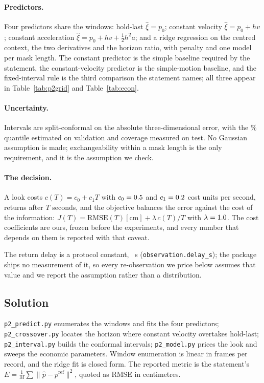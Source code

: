 \documentclass{swmcmthesis}
\begin{document}
\paragraph{Predictors.} Four predictors share the windows: hold-last
$\hat\xi=p_0$; constant velocity $\hat\xi=p_0+hv$; constant acceleration
$\hat\xi=p_0+hv+\tfrac12h^{2}a$; and a ridge regression on the centred context,
the two derivatives and the horizon ratio, with penalty \slotRidgeAlpha{} and one
model per mask length. The constant predictor is the simple baseline required by
the statement, the constant-velocity predictor is the simple-motion baseline, and
the fixed-interval rule is the third comparison the statement names; all three
appear in Table~\ref{tab:p2grid} and Table~\ref{tab:econ}.

\paragraph{Uncertainty.} Intervals are split-conformal on the absolute three-dimensional error,
with the \slotConfLevel{}\% quantile estimated on validation and coverage measured
on test. No Gaussian assumption is made; exchangeability within a mask length is
the only requirement, and it is the assumption we check.

\paragraph{The decision.} A look costs $c(T)=c_0+c_1T$ with $c_0=0.5$
and $c_1=0.2$ cost units per second, returns after $T$ seconds, and the
objective balances the error against the cost of the information:
$J(T)=\mathrm{RMSE}(T)[\mathrm{cm}]+\lambda\,c(T)/T$ with $\lambda=1.0$.
The cost coefficients are ours, frozen before the experiments, and every number
that depends on them is reported with that caveat.

The return delay is a protocol constant, \slotPSchedDelayDistribution{}~s
(\texttt{observation.delay\_s}); the package ships no measurement of it, so every
re-observation we price below assumes that value and we report the assumption rather
than a distribution.

\subsection{Solution}

\texttt{p2\_predict.py} enumerates the windows and fits the four predictors;
\texttt{p2\_crossover.py} locates the horizon where constant velocity overtakes
hold-last; \texttt{p2\_interval.py} builds the conformal intervals;
\texttt{p2\_model.py} prices the look and sweeps the economic parameters. Window
enumeration is linear in frames per record, and the ridge fit is closed form. The
reported metric is the statement's $E=\frac1M\sum\lVert\hat p-p^{\text{ref}}\rVert^{2}$,
quoted as RMSE in centimetres.
\end{document}
